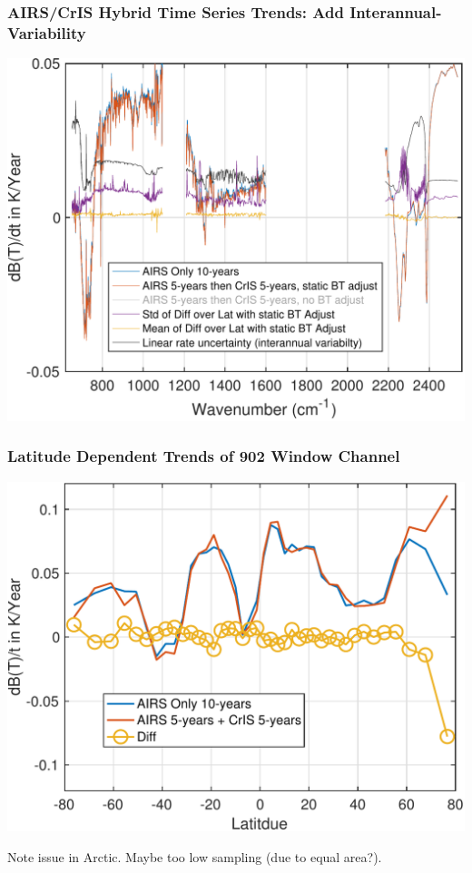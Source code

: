 \documentclass[10pt,t]{beamer}
\begin{document}
\begin{frame}
  \frametitle{\small AIRS/CrIS Hybrid Time Series Trends: Add Interannual-Variability}
  \centering   \includegraphics[width=0.8\linewidth]{Figs/trend_airs_vs_airs2cris_mean_std_diff_over_lat_and_interannual_var.pdf}
\end{frame}
\begin{frame}
  \frametitle{Latitude Dependent Trends of 902 \wn Window Channel}
  \centering   \includegraphics[width=0.8\linewidth]{Figs/trend_airs_vs_airs2cris_ch902wn_pm80deglat.pdf}

\small Note issue in Arctic.  Maybe too low sampling (due to equal area?).  
\end{frame}
\end{document}
